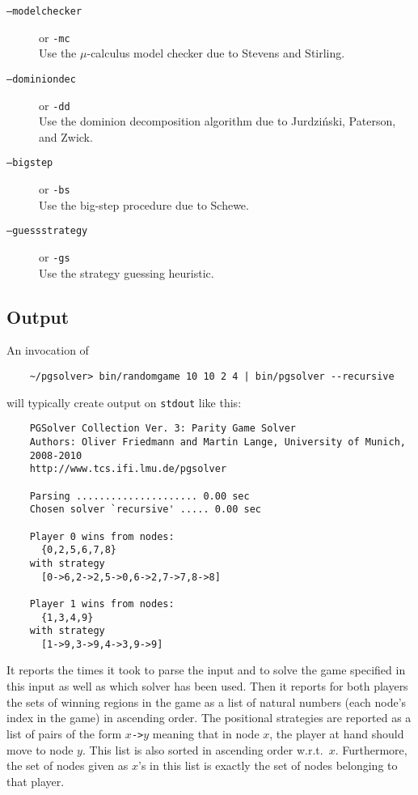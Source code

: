\begin{description}
\item[{\tt --modelchecker}] \enspace or {\tt -mc}  \\
   Use the $\mu$-calculus model checker due to Stevens and Stirling.

\item[{\tt --dominiondec}] \enspace or {\tt -dd} \\
   Use the dominion decomposition algorithm due to Jurdzi{\'n}ski, Paterson, and Zwick.

\item[{\tt --bigstep}] \enspace or {\tt -bs} \\
   Use the big-step procedure due to Schewe.

\item[{\tt --guessstrategy}] \enspace or {\tt -gs} \\
   Use the strategy guessing heuristic.

\end{description}



\subsection{Output}

An invocation of
\begin{verbatim}
    ~/pgsolver> bin/randomgame 10 10 2 4 | bin/pgsolver --recursive
\end{verbatim}
will typically create output on \texttt{stdout} like this:
\begin{verbatim}
    PGSolver Collection Ver. 3: Parity Game Solver
    Authors: Oliver Friedmann and Martin Lange, University of Munich, 
    2008-2010
    http://www.tcs.ifi.lmu.de/pgsolver

    Parsing ..................... 0.00 sec
    Chosen solver `recursive' ..... 0.00 sec

    Player 0 wins from nodes:
      {0,2,5,6,7,8}
    with strategy
      [0->6,2->2,5->0,6->2,7->7,8->8]

    Player 1 wins from nodes:
      {1,3,4,9}
    with strategy
      [1->9,3->9,4->3,9->9]
\end{verbatim}
It reports the times it took to parse the input and to solve the game specified in this input
as well as which solver has been used. Then it reports for both players the sets of winning
regions in the game as a list of natural numbers (each node's index in the game) in ascending order.
The positional strategies are reported as a list of pairs of the form $x$\texttt{->}$y$ meaning
that in node $x$, the player at hand should move to node $y$. This list is also sorted in
ascending order w.r.t.\ $x$. Furthermore, the set of nodes given as $x$'s in this list is
exactly the set of nodes belonging to that player.




